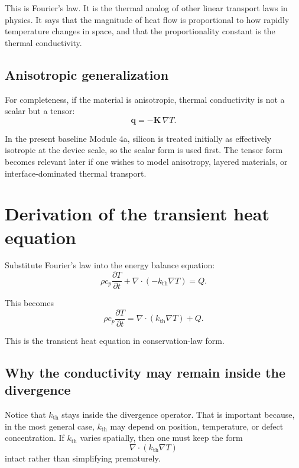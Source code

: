 \documentclass[11pt]{article}
\newcommand{\qvec}{\mathbf{q}}
\newcommand{\kth}{k_{\mathrm{th}}}
\begin{document}
This is Fourier's law. It is the thermal analog of other linear transport laws in physics. It says that the magnitude of heat flow is proportional to how rapidly temperature changes in space, and that the proportionality constant is the thermal conductivity.

\subsection{Anisotropic generalization}

For completeness, if the material is anisotropic, thermal conductivity is not a scalar but a tensor:
\begin{equation}
\qvec = -\bm{K}\,\nabla T.
\end{equation}

In the present baseline Module 4a, silicon is treated initially as effectively isotropic at the device scale, so the scalar form is used first. The tensor form becomes relevant later if one wishes to model anisotropy, layered materials, or interface-dominated thermal transport.

\section{Derivation of the transient heat equation}

Substitute Fourier's law into the energy balance equation:
\begin{equation}
\rho c_p \frac{\partial T}{\partial t} + \nabla \cdot (-\kth \nabla T) = Q.
\end{equation}

This becomes
\begin{equation}
\rho c_p \frac{\partial T}{\partial t} = \nabla \cdot (\kth \nabla T) + Q.
\end{equation}

This is the transient heat equation in conservation-law form.

\subsection{Why the conductivity may remain inside the divergence}

Notice that $\kth$ stays inside the divergence operator. That is important because, in the most general case, $\kth$ may depend on position, temperature, or defect concentration. If $\kth$ varies spatially, then one must keep the form
\begin{equation}
\nabla \cdot (\kth \nabla T)
\end{equation}
intact rather than simplifying prematurely.
\end{document}
